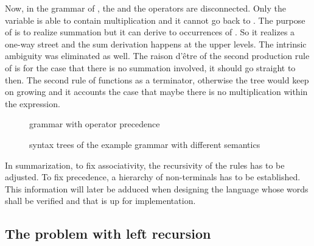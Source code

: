 \FloatBarrier

Now, in the grammar of , the \textterminal{+} and the \textterminal{*} operators are disconnected. Only the  variable is able to contain multiplication and it cannot go back to . The purpose of  is to realize summation but it can derive to occurrences of . So it realizes a one-way street and the sum derivation happens at the upper levels. The intrinsic ambiguity was eliminated as well. The raison d'être of the second production rule of  is for the case that there is no summation involved, it should go straight to  then. The second rule of  functions as a terminator, otherwise the tree would keep on growing and it accounts the case that maybe there is no multiplication within the expression.

\begin{figure}
	\centering
	
	

	\caption{grammar with operator precedence}
	\label{fig:grammar_ambPrecFixed}
\end{figure}

\begin{figure}
	\begin{center}
		
	\end{center}

	\caption{syntax trees of the example grammar with different semantics}
	\label{fig:tree_ambPrecFixed}
\end{figure}

In summarization, to fix associativity, the recursivity of the rules has to be adjusted. To fix precedence, a hierarchy of non-terminals has to be established. This information will later be adduced when designing the language whose words shall be verified and that is up for implementation.

\subsection{The problem with left recursion}

